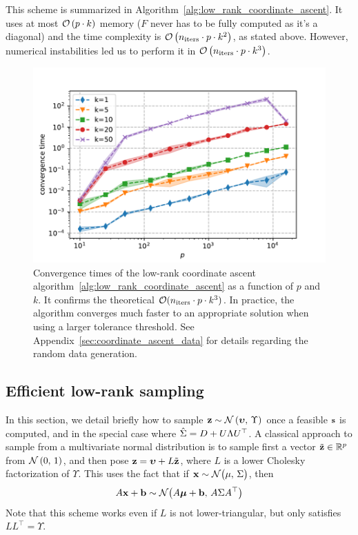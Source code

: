 This scheme is summarized in Algorithm~\ref{alg:low_rank_coordinate_ascent}.
It uses at most $\mathcal{O}\left( p \cdot k \right)$ memory ($F$ never has to be fully computed as it's a diagonal)
and the time complexity is $\mathcal{O}\left( n_\text{iters} \cdot p \cdot k^2 \right)$, as stated above.
However, numerical instabilities led us to perform it in $\mathcal{O}\left( n_\text{iters} \cdot p \cdot k^3 \right)$.
\begin{figure}
    \centering
    \includegraphics[width=0.8\linewidth, height=0.5\linewidth]{figures/low_rank_times.pdf}
    \caption{
        Convergence times of the low-rank coordinate ascent algorithm~\ref{alg:low_rank_coordinate_ascent}
        as a function of $p$ and $k$.
        It confirms the theoretical $\mathcal{O}(n_{\text{iters}} \cdot p \cdot k^3)$.
        In practice,
        the algorithm converges much faster to an appropriate solution when using a larger tolerance threshold.
        See Appendix~\ref{sec:coordinate_ascent_data} for details regarding the random data generation.
    }
    \label{fig:low_rank_times}
\end{figure}

\subsection{Efficient low-rank sampling}\label{subsec:low_rank_sampling}

In this section, we detail briefly how to sample $\mathbf{z} \sim \mathcal{N}\left( \bm{\upsilon},\, \Upsilon \right)$ once
a feasible $\mathbf{s}$ is computed, and in the special case where $\hat{\Sigma} = D + U\Lambda U^\top$.
A classical approach to sample from a multivariate normal distribution is to sample first a vector
$\tilde{\mathbf{z}} \in \mathbb{R}^p$ from $\mathcal{N}\left( 0,\, 1 \right)$,
and then pose $\mathbf{z} = \bm{\upsilon} + L\tilde{\mathbf{z}}$,
where $L$ is a lower Cholesky factorization of $\Upsilon$.
This uses the fact that if $\mathbf{x} \sim \mathcal{N}\big( \mu,\, \Sigma \big)$,
then
\begin{equation}\label{eq:affine_transformation}
    A\mathbf{x} + \mathbf{b} \sim \mathcal{N}\big( A\bm{\mu} + \mathbf{b},\, A\Sigma A^\top \big)
\end{equation}
Note that this scheme works even if $L$ is not lower-triangular,
but only satisfies $LL^\top = \Upsilon$.

